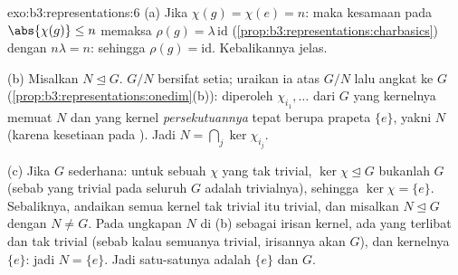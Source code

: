\begin{solution}{exo:b3:representations:6}
(a) Jika $\chi(g) = \chi(e) = n$: maka kesamaan pada
$\abs{\chi(g)} \leq n$ memaksa $\rho(g) = \lambda\,\mathrm{id}$
(\cref{prop:b3:representations:charbasics}) dengan $n\lambda = n$:
sehingga $\rho(g) = \mathrm{id}$. Kebalikannya jelas.

(b) Misalkan $N \trianglelefteq G$. 
$G/N$ bersifat setia; uraikan ia atas  $G/N$ lalu
angkat ke $G$ (\cref{prop:b3:representations:onedim}(b)):
diperoleh   $\chi_{i_1}, \dots$ dari $G$ yang kernelnya
memuat $N$ dan yang kernel \emph{persekutuannya} tepat berupa
prapeta $\{e\}$, yakni $N$ (karena kesetiaan pada ).
Jadi $N = \bigcap_j \ker\chi_{i_j}$.

(c) Jika $G$ sederhana: untuk sebuah $\chi$  yang tak trivial,
$\ker\chi \trianglelefteq G$ bukanlah $G$ (sebab  yang trivial pada seluruh $G$ adalah  trivialnya),
sehingga $\ker\chi = \{e\}$. Sebaliknya, andaikan semua kernel tak
trivial itu trivial, dan misalkan $N \trianglelefteq G$ dengan $N \neq
G$. Pada ungkapan $N$ di (b) sebagai irisan kernel,
ada  yang terlibat dan tak trivial (sebab kalau semuanya trivial,
irisannya akan $G$), dan kernelnya $\{e\}$: jadi $N =
\{e\}$. Jadi satu-satunya  adalah $\{e\}$ dan $G$.
\end{solution}

